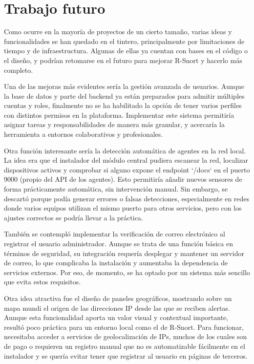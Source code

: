 \documentclass[11pt,a4paper,twoside]{report}
\begin{document}
\clearpage
\null
\thispagestyle{empty}
\newpage
\chapter*{Trabajo futuro}

Como ocurre en la mayoría de proyectos de un cierto tamaño, varias ideas y funcionalidades se han quedado en el tintero, principalmente por limitaciones de tiempo y de infraestructura. Algunas de ellas ya cuentan con bases en el código o el diseño, y podrían retomarse en el futuro para mejorar R-Snort y hacerlo más completo.\newline

Una de las mejoras más evidentes sería la gestión avanzada de usuarios. Aunque la base de datos y parte del backend ya están preparados para admitir múltiples cuentas y roles, finalmente no se ha habilitado la opción de tener varios perfiles con distintos permisos en la plataforma. Implementar este sistema permitiría asignar tareas y responsabilidades de manera más granular, y acercaría la herramienta a entornos colaborativos y profesionales.\newline

Otra función interesante sería la detección automática de agentes en la red local. La idea era que el instalador del módulo central pudiera escanear la red, localizar dispositivos activos y comprobar si alguno expone el endpoint `/docs` en el puerto 9000 (propio del API de los agentes). Esto permitiría añadir nuevos sensores de forma prácticamente automática, sin intervención manual. Sin embargo, se descartó porque podía generar errores o falsas detecciones, especialmente en redes donde varios equipos utilizan el mismo puerto para otros servicios, pero con los ajustes correctos se podría llevar a la práctica.\newline

También se contempló implementar la verificación de correo electrónico al registrar el usuario administrador. Aunque se trata de una función básica en términos de seguridad, su integración requería desplegar y mantener un servidor de correo, lo que complicaba la instalación y aumentaba la dependencia de servicios externos. Por eso, de momento, se ha optado por un sistema más sencillo que evita estos requisitos.\newline

Otra idea atractiva fue el diseño de paneles geográficos, mostrando sobre un mapa mundi el origen de las direcciones IP desde las que se reciben alertas. Aunque esta funcionalidad aporta un valor visual y contextual importante, resultó poco práctica para un entorno local como el de R-Snort. Para funcionar, necesitaba acceder a servicios de geolocalización de IPs, muchos de los cuales son de pago o requieren un registro manual que no es automatizable fácilmente en el instalador y se quería evitar tener que registrar al usuario en páginas de terceros.\newline
\end{document}
